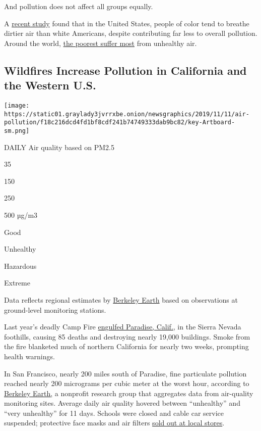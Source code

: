 And pollution does not affect all groups equally.

A \href{https://www.pnas.org/content/116/13/6001}{recent study} found
that in the United States, people of color tend to breathe dirtier air
than white Americans, despite contributing far less to overall
pollution. Around the world,
\href{https://www.unenvironment.org/news-and-stories/story/air-pollution-hurts-poorest-most}{the
poorest suffer most} from unhealthy air.

\hypertarget{wildfires-increase-pollution-in-california-and-the-western-us}{%
\subsection{Wildfires Increase Pollution in California and the Western
U.S.}\label{wildfires-increase-pollution-in-california-and-the-western-us}}

\texttt{[image: https://static01.graylady3jvrrxbe.onion/newsgraphics/2019/11/11/air-pollution/f18c216dcd4fd1bf8cdf241b74749333dab9bc82/key-Artboard-sm.png]}

DAILY Air quality based on PM2.5

35

150

250

500 µg/m3

Good

Unhealthy

Hazardous

Extreme

Data reflects regional estimates by
\href{http://berkeleyearth.org/air-quality-real-time-map/}{Berkeley
Earth} based on observations at ground-level monitoring stations.

Last year's deadly Camp Fire
\href{https://www.nytimes3xbfgragh.onion/interactive/2018/12/26/us/paradise-california-camp-fire.html}{engulfed
Paradise, Calif.}, in the Sierra Nevada foothills, causing 85 deaths and
destroying nearly 19,000 buildings. Smoke from the fire blanketed much
of northern California for nearly two weeks, prompting health warnings.

In San Francisco, nearly 200 miles south of Paradise, fine particulate
pollution reached nearly 200 micrograms per cubic meter at the worst
hour, according to
\href{http://berkeleyearth.org/air-quality-real-time-map/}{Berkeley
Earth,} a nonprofit research group that aggregates data from air-quality
monitoring sites. Average daily air quality hovered between
``unhealthy'' and ``very unhealthy'' for 11 days. Schools were closed
and cable car service suspended; protective face masks and air filters
\href{https://www.cbsnews.com/news/fires-in-california-protective-masks-high-demand-camp-fire-bay-area/}{sold
out at local stores}.

